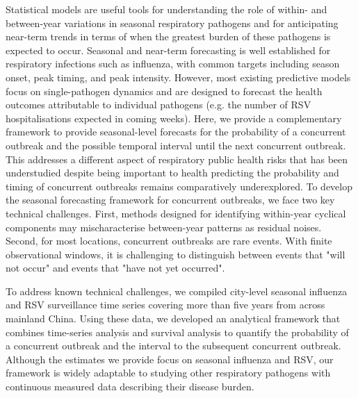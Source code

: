 Statistical models are useful tools for understanding the role of within- and between-year variations in seasonal respiratory pathogens and for anticipating near-term trends in terms of when the greatest burden of these pathogens is expected to occur.
Seasonal and near-term forecasting is well established for respiratory infections such as influenza, with common targets including season onset, peak timing, and peak intensity.
However, most existing predictive models focus on single-pathogen dynamics and are designed to forecast the health outcomes attributable to individual pathogens (e.g. the number of RSV hospitalisations expected in coming weeks).
Here, we provide a complementary framework to provide seasonal-level forecasts for the probability of a concurrent outbreak and the possible temporal interval until the next concurrent outbreak.
This addresses a different aspect of respiratory public health risks that has been understudied despite being important to health predicting the probability and timing of concurrent outbreaks remains comparatively underexplored.
To develop the seasonal forecasting framework for concurrent outbreaks, we face two key technical challenges.
First, methods designed for identifying within-year cyclical components may mischaracterise between-year patterns as residual noises. 
Second, for most locations, concurrent outbreaks are rare events.
With finite observational windows, it is challenging to distinguish between events that "will not occur" and events that "have not yet occurred".

To address known technical challenges, we compiled city-level seasonal influenza and RSV surveillance time series covering more than five years from across mainland China.
Using these data, we developed an analytical framework that combines time-series analysis and survival analysis to quantify the probability of a concurrent outbreak and the interval to the subsequent concurrent outbreak. 
Although the estimates we provide focus on seasonal influenza and RSV, our framework is widely adaptable to studying other respiratory pathogens with continuous measured data describing their disease burden.
